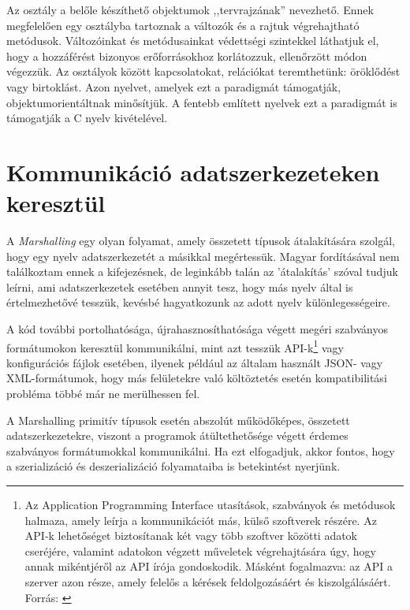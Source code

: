 \documentclass[tocnopagenum]{thesis-ekf}
\begin{document}
	 Az osztály a belőle készíthető objektumok ,,tervrajzának'' nevezhető. Ennek megfelelően egy osztályba tartoznak a változók és a rajtuk végrehajtható metódusok. Változóinkat és metódusainkat védettségi szintekkel láthatjuk el, hogy a hozzáférést bizonyos erőforrásokhoz korlátozzuk, ellenőrzött módon végezzük. Az osztályok között kapcsolatokat, relációkat teremthetünk: öröklődést vagy birtoklást. Azon nyelvet, amelyek ezt a paradigmát támogatják, objektumorientáltnak minősítjük.
	A fentebb említett nyelvek ezt a paradigmát is támogatják a C nyelv kivételével.
	\section{Kommunikáció adatszerkezeteken keresztül}
	A \emph{Marshalling} egy olyan folyamat, amely összetett típusok átalakítására szolgál, hogy egy nyelv adatszerkezetét a másikkal megértessük. Magyar fordításával nem találkoztam ennek a kifejezésnek, de leginkább talán az 'átalakítás' szóval tudjuk leírni, ami adatszerkezetek esetében annyit tesz, hogy más nyelv által is értelmezhetővé tesszük, kevésbé hagyatkozunk az adott nyelv különlegességeire.\cite{sof_marshalling}
	\par
	A kód további portolhatósága, újrahasznosíthatósága végett megéri szabványos formátumokon keresztül kommunikálni, mint azt tesszük API-k\footnote{Az Application Programming Interface utasítások, szabványok és metódusok halmaza, amely leírja a kommunikációt más, külső szoftverek részére. Az API-k lehetőséget biztosítanak két vagy több szoftver közötti adatok cseréjére, valamint adatokon végzett műveletek végrehajtására úgy, hogy annak mikéntjéről az API írója gondoskodik. Másként fogalmazva: az API a szerver azon része, amely felelős a kérések feldolgozásáért és kiszolgálásáért. Forrás: \cite{api}} vagy konfigurációs fájlok esetében, ilyenek például az általam használt JSON- vagy XML-formátumok,  hogy más felületekre való költöztetés esetén kompatibilitási probléma többé már ne merülhessen fel.
	
	A Marshalling primitív típusok esetén abszolút működőképes, összetett adatszerkezetekre, viszont a programok átültethetősége végett érdemes szabványos formátumokkal kommunikálni. Ha ezt elfogadjuk, akkor fontos, hogy a szerializáció és deszerializáció folyamataiba is betekintést nyerjünk.
\end{document}
